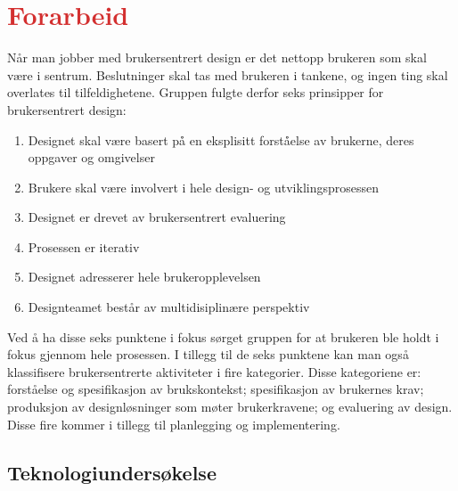 \section{\textcolor[HTML]{D32F2F}{Forarbeid}}

Når man jobber med brukersentrert design er det nettopp brukeren som skal være i sentrum. Beslutninger skal tas med brukeren i tankene, og ingen ting skal overlates til tilfeldighetene. Gruppen fulgte derfor seks prinsipper for brukersentrert design:
\begin{enumerate}
    \item Designet skal være basert på̊ en eksplisitt forstå̊else av brukerne, deres oppgaver og omgivelser
    \item Brukere skal være involvert i hele design- og utviklingsprosessen
    \item Designet er drevet av brukersentrert evaluering
    \item Prosessen er iterativ
    \item Designet adresserer hele brukeropplevelsen
    \item Designteamet består av multidisiplinære perspektiv
\end{enumerate}

\noindent Ved å ha disse seks punktene i fokus sørget gruppen for at brukeren ble holdt i fokus gjennom hele prosessen. I tillegg til de seks punktene kan man også klassifisere brukersentrerte aktiviteter i fire kategorier. Disse kategoriene er: forståelse og spesifikasjon av brukskontekst; spesifikasjon av brukernes krav; produksjon av designløsninger som møter brukerkravene; og evaluering av design. Disse fire kommer i tillegg til planlegging og implementering.

\subsection{Teknologiundersøkelse}

